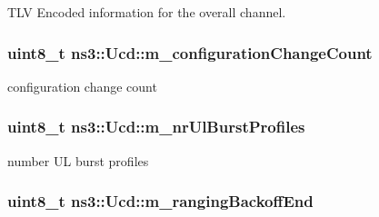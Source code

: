 T\+LV Encoded information for the overall channel. 

\subsubsection[{\texorpdfstring{m\+\_\+configuration\+Change\+Count}{m_configurationChangeCount}}]{\setlength{\rightskip}{0pt plus 5cm}uint8\+\_\+t ns3\+::\+Ucd\+::m\+\_\+configuration\+Change\+Count\hspace{0.3cm}{\ttfamily [private]}}\hypertarget{classns3_1_1Ucd_ad8588333860e7ee98bf544151dde0547}{}\label{classns3_1_1Ucd_ad8588333860e7ee98bf544151dde0547}


configuration change count 

\subsubsection[{\texorpdfstring{m\+\_\+nr\+Ul\+Burst\+Profiles}{m_nrUlBurstProfiles}}]{\setlength{\rightskip}{0pt plus 5cm}uint8\+\_\+t ns3\+::\+Ucd\+::m\+\_\+nr\+Ul\+Burst\+Profiles\hspace{0.3cm}{\ttfamily [private]}}\hypertarget{classns3_1_1Ucd_a1f48b85ec8e263a0ec5b59e9f5f6b5d4}{}\label{classns3_1_1Ucd_a1f48b85ec8e263a0ec5b59e9f5f6b5d4}


number UL burst profiles 

\subsubsection[{\texorpdfstring{m\+\_\+ranging\+Backoff\+End}{m_rangingBackoffEnd}}]{\setlength{\rightskip}{0pt plus 5cm}uint8\+\_\+t ns3\+::\+Ucd\+::m\+\_\+ranging\+Backoff\+End\hspace{0.3cm}{\ttfamily [private]}}\hypertarget{classns3_1_1Ucd_a3d2a0adbdf513ce664f981286c38fdc5}{}\label{classns3_1_1Ucd_a3d2a0adbdf513ce664f981286c38fdc5}


